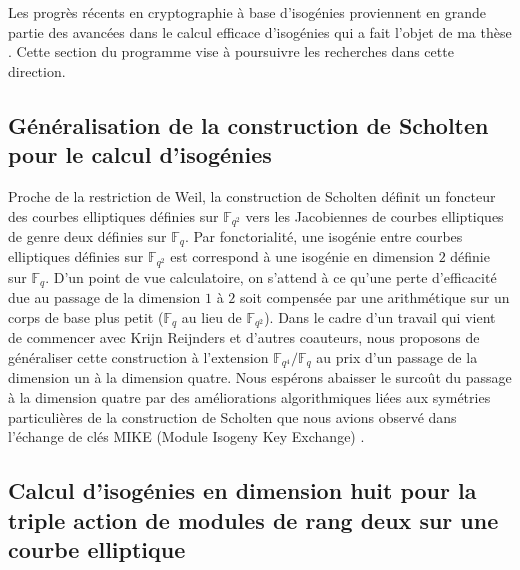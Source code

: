 \documentclass[a4paper,10pt]{scrartcl}
\theoremstyle{definition}
\theoremstyle{plain}
\theoremstyle{definition}
\newcommand{\F}{\mathbb{F}}
\renewcommand{\(}{\left(}
\renewcommand{\)}{\right)}
\begin{document}
Les progrès récents en cryptographie à base d'isogénies proviennent en grande partie des avancées dans le calcul efficace d'isogénies qui a fait l'objet de ma thèse \cite{PADphd}. Cette section du programme vise à poursuivre les recherches dans cette direction. 

\subsection{Généralisation de la construction de Scholten pour le calcul d'isogénies}

Proche de la restriction de Weil, la construction de Scholten définit un foncteur des courbes elliptiques définies sur $\mathbb{F}_{q^2}$ vers les Jacobiennes de courbes elliptiques de genre deux définies sur $\mathbb{F}_q$. Par fonctorialité, une isogénie entre courbes elliptiques définies sur $\mathbb{F}_{q^2}$ est correspond à une isogénie en dimension $2$ définie sur $\mathbb{F}_q$. D'un point de vue calculatoire, on s'attend à ce qu'une perte d'efficacité due au passage de la dimension $1$ à $2$ soit compensée par une arithmétique sur un corps de base plus petit ($\F_q$ au lieu de $\F_{q^2}$). Dans le cadre d'un travail qui vient de commencer avec Krijn Reijnders et d'autres coauteurs, nous proposons de généraliser cette construction à l'extension $\mathbb{F}_{q^4}/\F_q$ au prix d'un passage de la dimension un à la dimension quatre. Nous espérons abaisser le surcoût du passage à la dimension quatre par des améliorations algorithmiques liées aux symétries particulières de la construction de Scholten que nous avions observé dans l'échange de clés MIKE (Module Isogeny Key Exchange) \cite{MIKE}. 

\subsection{Calcul d'isogénies en dimension huit pour la triple action de modules de rang deux sur une courbe elliptique}
\end{document}
